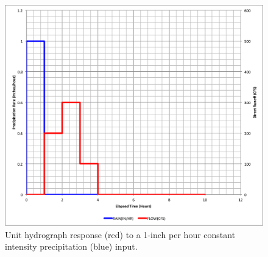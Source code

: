 \documentclass[12pt]{article}
\begin{document}
\begin{enumerate}
\begin{figure}[htbp] %
   \centering
   \includegraphics[width=5in]{UnitHydrographInput.png} 
   \caption{Unit hydrograph response (red) to a 1-inch per hour constant intensity precipitation (blue) input.}
   \label{fig:UnitHydrographInput}
\end{figure}


\end{enumerate}
\end{document}
